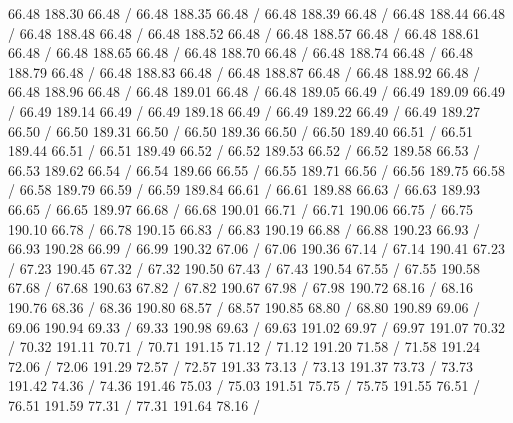 { 66.48 188.30 66.48 /
 66.48 188.35 66.48 /
 66.48 188.39 66.48 /
 66.48 188.44 66.48 /
 66.48 188.48 66.48 /
 66.48 188.52 66.48 /
 66.48 188.57 66.48 /
 66.48 188.61 66.48 /
 66.48 188.65 66.48 /
 66.48 188.70 66.48 /
 66.48 188.74 66.48 /
 66.48 188.79 66.48 /
 66.48 188.83 66.48 /
 66.48 188.87 66.48 /
 66.48 188.92 66.48 /
 66.48 188.96 66.48 /
 66.48 189.01 66.48 /
 66.48 189.05 66.49 /
 66.49 189.09 66.49 /
 66.49 189.14 66.49 /
 66.49 189.18 66.49 /
 66.49 189.22 66.49 /
 66.49 189.27 66.50 /
 66.50 189.31 66.50 /
 66.50 189.36 66.50 /
 66.50 189.40 66.51 /
 66.51 189.44 66.51 /
 66.51 189.49 66.52 /
 66.52 189.53 66.52 /
 66.52 189.58 66.53 /
 66.53 189.62 66.54 /
 66.54 189.66 66.55 /
 66.55 189.71 66.56 /
 66.56 189.75 66.58 /
 66.58 189.79 66.59 /
 66.59 189.84 66.61 /
 66.61 189.88 66.63 /
 66.63 189.93 66.65 /
 66.65 189.97 66.68 /
 66.68 190.01 66.71 /
 66.71 190.06 66.75 /
 66.75 190.10 66.78 /
 66.78 190.15 66.83 /
 66.83 190.19 66.88 /
 66.88 190.23 66.93 /
 66.93 190.28 66.99 /
 66.99 190.32 67.06 /
 67.06 190.36 67.14 /
 67.14 190.41 67.23 /
 67.23 190.45 67.32 /
 67.32 190.50 67.43 /
 67.43 190.54 67.55 /
 67.55 190.58 67.68 /
 67.68 190.63 67.82 /
 67.82 190.67 67.98 /
 67.98 190.72 68.16 /
 68.16 190.76 68.36 /
 68.36 190.80 68.57 /
 68.57 190.85 68.80 /
 68.80 190.89 69.06 /
 69.06 190.94 69.33 /
 69.33 190.98 69.63 /
 69.63 191.02 69.97 /
 69.97 191.07 70.32 /
 70.32 191.11 70.71 /
 70.71 191.15 71.12 /
 71.12 191.20 71.58 /
 71.58 191.24 72.06 /
 72.06 191.29 72.57 /
 72.57 191.33 73.13 /
 73.13 191.37 73.73 /
 73.73 191.42 74.36 /
 74.36 191.46 75.03 /
 75.03 191.51 75.75 /
 75.75 191.55 76.51 /
 76.51 191.59 77.31 /
 77.31 191.64 78.16 /
}
